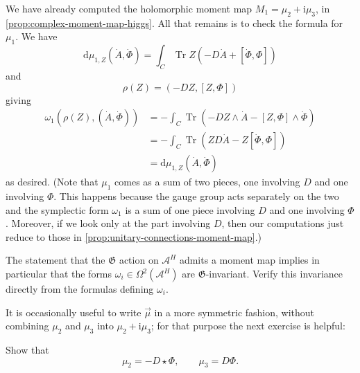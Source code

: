 \documentclass[12pt,letterpaper,reqno]{article}
\numberwithin{equation}{section}
\newcommand{\fG}{{\mathfrak G}}
\newcommand{\cA}{\ensuremath{\mathcal A}}
\newcommand{\I}{{\mathrm i}}
\newcommand{\de}{\mathrm{d}}
\DeclareMathOperator{\Tr}{Tr}
\begin{document}
\begin{pf} We have already computed the holomorphic moment map
$M_1 = \mu_2 + \I \mu_3$, in \autoref{prop:complex-moment-map-higgs}. 
All that remains is to check the formula for $\mu_1$. 
We have
\begin{equation}
  \de \mu_{1,Z}(\dot A, \dot \Phi) = \int_C \Tr Z\left(- D \dot{A} + [\dot\Phi,\Phi] \right)
\end{equation}
and
\begin{equation}
  \rho(Z) = (-DZ, [Z,\Phi])
\end{equation}
giving
\begin{align}
  \omega_1(\rho(Z), (\dot A, \dot \Phi)) &= - \int_C \Tr(- D Z \wedge \dot A - [Z,\Phi] \wedge \dot \Phi) \\
  &= - \int_C \Tr(Z D\dot A - Z[\dot \Phi, \Phi]) \\
  &= \de \mu_{1,Z}(\dot A, \dot \Phi)
\end{align}
as desired.
(Note that $\mu_1$ comes as a sum of two pieces, one involving $D$ and 
one involving $\Phi$. This happens because the gauge group acts 
separately on the two and the symplectic form $\omega_1$ is a sum
of one piece involving $D$ and one involving $\Phi$. Moreover, if
we look only at the part involving $D$, then our computations
just reduce to those in \autoref{prop:unitary-connections-moment-map}.)
\end{pf}

\begin{exercise} The statement that the $\fG$ action on $\cA^H$ admits a moment map
implies in particular that the forms $\omega_i \in \Omega^2(\cA^H)$ are $\fG$-invariant.
Verify this invariance directly from the formulas defining $\omega_i$.
\end{exercise}

It is occasionally useful to write $\vec\mu$ in a more symmetric fashion,
without combining $\mu_2$ and $\mu_3$ into $\mu_2 + \I \mu_3$; for that 
purpose the next exercise is helpful:

\begin{exercise} Show that
\begin{equation}
  \mu_2 = -D \star \Phi, \qquad \mu_3 = D \Phi.
\end{equation}
\end{exercise}
\end{document}
